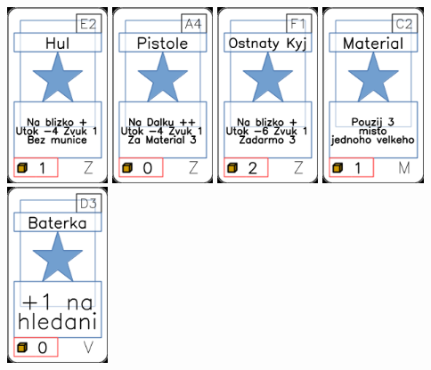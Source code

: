 \documentclass[a4paper]{article}
\begin{document}
	\includegraphics[width=3.0cm]{img-1_81}
	\includegraphics[width=3.0cm]{img-1_93}
	\includegraphics[width=3.0cm]{img-1_85}
	\includegraphics[width=3.0cm]{img-1_41}
	\includegraphics[width=3.0cm]{img-1_77}
\end{document}
